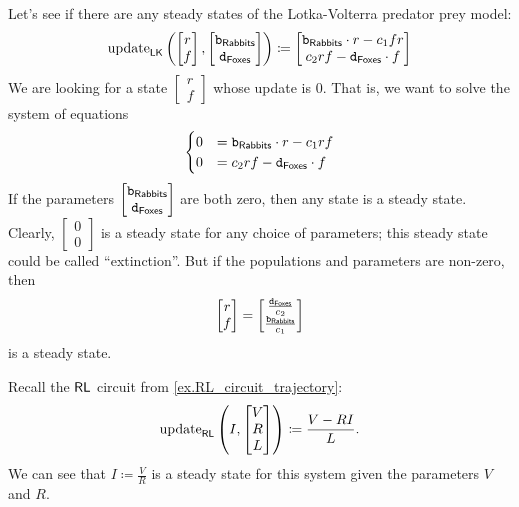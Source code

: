\documentclass[DynamicalBook]{subfiles}
\begin{document}
\begin{example}\label{ex.lotka_volterra_steady}
Let's see if there are any steady states of the Lotka-Volterra predator prey
model:
  \[
\mathrm{update}_{\mathsf{LK}}\left( \begin{bmatrix} r \\ f\end{bmatrix}, \begin{bmatrix}
    \mathtt{b}_{\mathsf{Rabbits}} \\ \mathtt{d}_{\mathsf{Foxes}} \end{bmatrix}\right)
  \coloneqq \begin{bmatrix}\mathtt{b}_{\mathsf{Rabbits}}
\cdot r - c_1 f r \\ c_2 r f - \mathtt{d}_{\mathsf{Foxes}}
\cdot f
 \end{bmatrix}
  \]
We are looking for a state $\begin{bmatrix} r \\ f \end{bmatrix}$ whose
update is $0$. That is, we want to solve the system of equations
\[
  \begin{cases}
    0 &= \mathtt{b}_{\mathsf{Rabbits}} \cdot r - c_1 r f \\
    0 &= c_2 r f - \mathtt{d}_{\mathsf{Foxes}} \cdot f
  \end{cases}
\]
If the parameters $\begin{bmatrix} \mathtt{b}_{\mathsf{Rabbits}} \\
  \mathtt{d}_{\mathsf{Foxes}} \end{bmatrix}$ are both zero, then any state is a
steady state. Clearly, $\begin{bmatrix} 0 \\ 0 \end{bmatrix}$ is a steady state
for any choice of parameters; this steady state could be called ``extinction''.
But if the populations and parameters are non-zero, then
\[
  \begin{bmatrix}
r \\ f 
\end{bmatrix}
= \begin{bmatrix}
  \frac{\mathtt{d}_{\mathsf{Foxes}}}{c_2} \\
  \frac{\mathtt{b}_{\mathsf{Rabbits}}}{c_1}
\end{bmatrix}
\]
is a steady state.
\end{example}

\begin{example}\label{ex.RL_circuit_steady}
  Recall the $\mathsf{RL}$ circuit from \cref{ex.RL_circuit_trajectory}:
  \[
\mathrm{update}_{\mathsf{RL}}\left( I, \begin{bmatrix} V \\ R \\ L \end{bmatrix} \right) \coloneqq
\frac{V - RI}{L}.
  \]
  We can see that $I \coloneqq \frac{V}{R}$ is a steady state for this system
  given the parameters $V$ and $R$.
\end{example}
\end{document}
